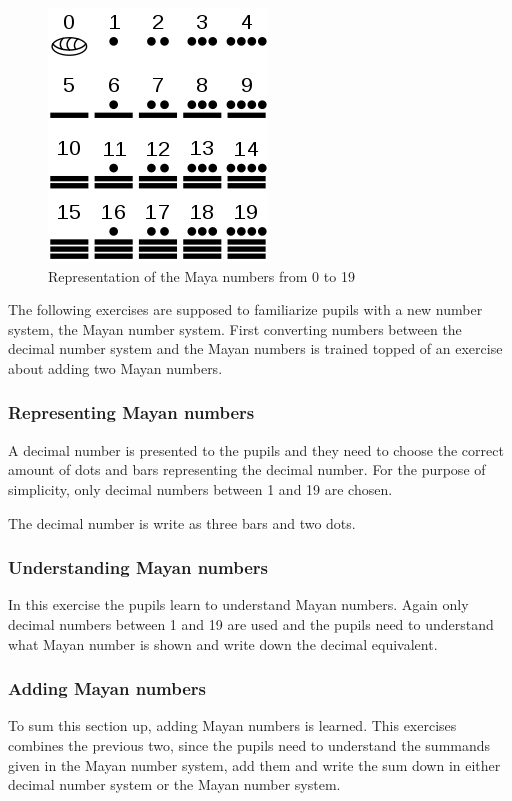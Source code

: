 \begin{figure} 
    \centering
    \includegraphics[width=0.3 \columnwidth]{figures/maya_number_system.png}
    \caption{Representation of the Maya numbers from 0 to 19} 
    \label{fig:maya_numerals} 
\end{figure}

The following exercises are supposed to familiarize pupils with a new number system, the Mayan number system. First converting numbers between the decimal number system and the Mayan numbers is trained topped of an exercise about adding two Mayan numbers.

\subsubsection*{Representing Mayan numbers}

A decimal number is presented to the pupils and they need to choose the correct amount of dots and bars representing the decimal number. For the purpose of simplicity, only decimal numbers between 1 and 19 are chosen.

\begin{example}
    The decimal number  is write as three bars and two dots.
\end{example}

\subsubsection*{Understanding Mayan numbers}

In this exercise the pupils learn to understand Mayan numbers. Again only decimal numbers between 1 and 19 are used and the pupils need to understand what Mayan number is shown and write down the decimal equivalent.

\subsubsection*{Adding Mayan numbers}

To sum this section up, adding Mayan numbers is learned. This exercises combines the previous two, since the pupils need to understand the summands given in the Mayan number system, add them and write the sum down in either decimal number system or the Mayan number system.

